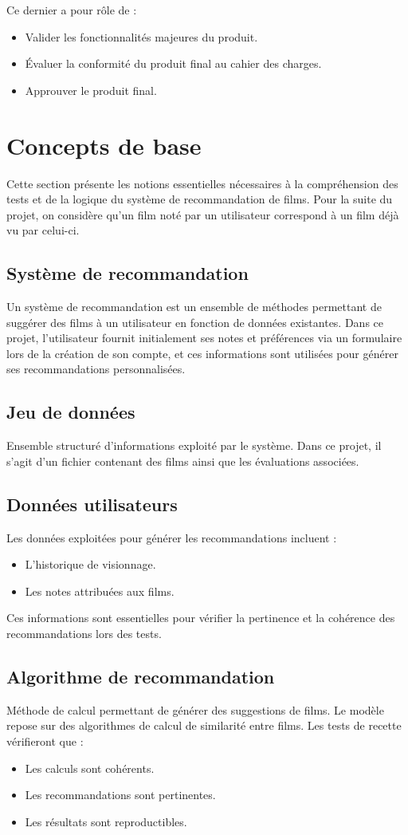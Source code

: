 \documentclass[a4paper,12pt]{report}
\begin{document}
Ce dernier a pour rôle de :
\begin{itemize}
    \item Valider les fonctionnalités majeures du produit.
    \item Évaluer la conformité du produit final au cahier des charges.
    \item Approuver le produit final.
\end{itemize}
\chapter{Concepts de base}
Cette section présente les notions essentielles nécessaires à la compréhension des tests et de la logique du système de recommandation de films. Pour la suite du projet, on considère qu'un film noté par un utilisateur correspond à un film déjà vu par celui-ci.
\section{Système de recommandation}
\label{SR1}
Un système de recommandation est un ensemble de méthodes permettant de suggérer des films à un utilisateur en fonction de données existantes. Dans ce projet, l'utilisateur fournit initialement ses notes et préférences via un formulaire lors de la création de son compte, et ces informations sont utilisées pour générer ses recommandations personnalisées.

\section{Jeu de données}
\label{JD1}
Ensemble structuré d'informations exploité par le système. Dans ce projet, il s'agit d'un fichier contenant des films ainsi que les évaluations associées.

\section{Données utilisateurs}
\label{DU1}
Les données exploitées pour générer les recommandations incluent : 
\begin{itemize}
    \item L'historique de visionnage.
    \item Les notes attribuées aux films.
\end{itemize}
Ces informations sont essentielles pour vérifier la pertinence et la cohérence des recommandations lors des tests.

\section{Algorithme de recommandation}
\label{ADR1}
Méthode de calcul permettant de générer des suggestions de films. Le modèle repose sur des algorithmes de calcul de similarité entre films.
Les tests de recette vérifieront que : 
\begin{itemize}
    \item Les calculs sont cohérents.
    \item Les recommandations sont pertinentes.
    \item Les résultats sont reproductibles.
\end{itemize}
\end{document}
